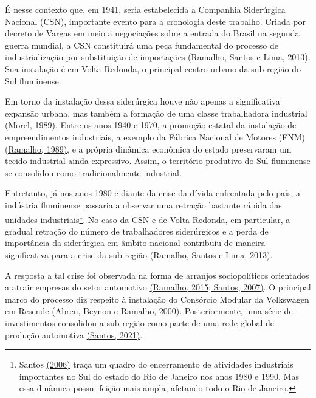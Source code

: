 É nesse contexto que, em 1941, seria estabelecida a Companhia
Siderúrgica Nacional (CSN), importante evento para a cronologia deste
trabalho. Criada por decreto de Vargas em meio a negociações sobre a
entrada do Brasil na segunda guerra mundial, a CSN constituirá uma peça
fundamental do processo de industrialização por substituição de
importações \href{https://www.zotero.org/google-docs/?mSOr4o}{(Ramalho,
Santos e Lima, 2013)}. Sua instalação é em Volta Redonda, o principal
centro urbano da sub-região do Sul fluminense.

Em torno da instalação dessa siderúrgica houve não apenas a
significativa expansão urbana, mas também a formação de uma classe
trabalhadora industrial
\href{https://www.zotero.org/google-docs/?3VJEnI}{(Morel, 1989)}. Entre
os anos 1940 e 1970, a promoção estatal da instalação de empreendimentos
industriais, a exemplo da Fábrica Nacional de Motores (FNM)
\href{https://www.zotero.org/google-docs/?YHTmgi}{(Ramalho, 1989)}, e a
própria dinâmica econômica do estado preservaram um tecido industrial
ainda expressivo. Assim, o território produtivo do Sul fluminense se
consolidou como tradicionalmente industrial.

Entretanto, já nos anos 1980 e diante da crise da dívida enfrentada pelo
país, a indústria fluminense passaria a observar uma retração bastante
rápida das unidades industriais\footnote{Santos
  \href{https://www.zotero.org/google-docs/?1lM2aG}{(2006)} traça um
  quadro do encerramento de atividades industriais importantes no Sul do
  estado do Rio de Janeiro nos anos 1980 e 1990. Mas essa dinâmica
  possui feição mais ampla, afetando todo o Rio de Janeiro.}. No caso da
CSN e de Volta Redonda, em particular, a gradual retração do número de
trabalhadores siderúrgicos e a perda de importância da siderúrgica em
âmbito nacional contribuiu de maneira significativa para a crise da
sub-região \href{https://www.zotero.org/google-docs/?5M72z0}{(Ramalho,
Santos e Lima, 2013)}.

A resposta a tal crise foi observada na forma de arranjos sociopolíticos
orientados a atrair empresas do setor automotivo
\href{https://www.zotero.org/google-docs/?zKdBOM}{(Ramalho, 2015;
Santos, 2007)}. O principal marco do processo diz respeito à instalação
do Consórcio Modular da Volkswagen em Resende
\href{https://www.zotero.org/google-docs/?tDsDc8}{(Abreu, Beynon e
Ramalho, 2000)}. Posteriormente, uma série de investimentos consolidou a
sub-região como parte de uma rede global de produção automotiva
\href{https://www.zotero.org/google-docs/?lUPNv9}{(Santos, 2021)}.

